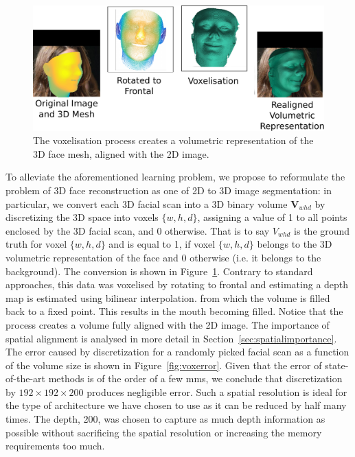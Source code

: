 \begin{figure}
  \centering
  \includegraphics[width=0.9\linewidth]{img/discretisation.pdf}

  \caption[Dataset voxelisation procedure]{The voxelisation process
    creates a volumetric representation of the 3D face mesh, aligned
    with the 2D image.}
  \label{fig:discretisation}
\end{figure}

To alleviate the aforementioned learning problem, we propose to
reformulate the problem of 3D face reconstruction as one of 2D to 3D
image segmentation: in particular, we convert each 3D facial scan into
a 3D binary volume $\mathbf{V}_{whd}$ by discretizing the 3D space
into voxels $\{w,h,d\}$, assigning a value of 1 to all points enclosed
by the 3D facial scan, and 0 otherwise. That is to say $ V_{whd}$ is
the ground truth for voxel $\{w,h,d\}$ and is equal to 1, if voxel
$\{w,h,d\}$ belongs to the 3D volumetric representation of the face
and 0 otherwise (i.e. it belongs to the background). The conversion is
shown in Figure~\ref{fig:discretisation}. Contrary to standard
approaches, this data was voxelised by rotating to frontal and
estimating a depth map is estimated using bilinear interpolation. from
which the volume is filled back to a fixed point. This results in the
mouth becoming filled. Notice that the process creates a volume fully
aligned with the 2D image. The importance of spatial alignment is
analysed in more detail in Section~\ref{sec:spatialimportance}. The
error caused by discretization for a randomly picked facial scan as a
function of the volume size is shown in
Figure~\ref{fig:voxerror}. Given that the error of state-of-the-art
methods \cite{roth2016adaptive,liu2016joint} is of the order of a few
mms, we conclude that discretization by $192\times 192\times 200$
produces negligible error. Such a spatial resolution is ideal for the
type of architecture we have chosen to use as it can be reduced by
half many times. The depth, 200, was chosen to capture as much depth
information as possible without sacrificing the spatial resolution or
increasing the memory requirements too much.

